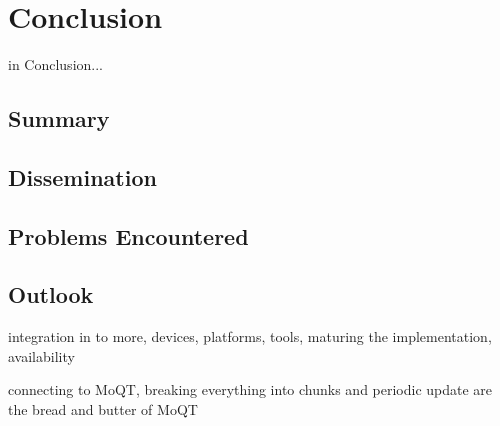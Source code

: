\chapter{Conclusion\label{cha:chapter7}}

in Conclusion...

\section{Summary\label{sec:summary}}



\section{Dissemination\label{sec:dissemination}}



\section{Problems Encountered\label{sec:problems}}



\section{Outlook\label{sec:outlook}}

integration in to more, devices, platforms, tools, maturing the implementation, availability

connecting to MoQT, breaking everything into chunks and periodic update are the bread and butter of MoQT